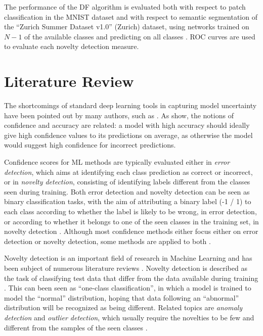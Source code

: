 \documentclass[10pt]{article}
\begin{document}
The performance of the \acrlong{DF} algorithm is evaluated both with respect to patch classification in the \gls{MNIST} dataset and with respect to semantic segmentation of the ``Zurich Summer Dataset v1.0'' (Zurich) dataset, using networks trained on $N-1$ of the available classes and predicting on all classes \cite{mnist, Volpi2015SemanticSO}. \acrfull{ROC} curves are used to evaluate each novelty detection measure.

\section{Literature Review}
\label{sec:lit}
The shortcomings of standard deep learning tools in capturing model uncertainty have been pointed out by many authors, such as \textcite{ghahramani, NguyenYC14, mandelbaum17}. As \textcite{subramanya} show, the notions of confidence and accuracy are related: a model with high accuracy should ideally give high confidence values to its predictions on average, as otherwise the model would suggest high confidence for incorrect predictions.

Confidence scores for \gls{ML} methods are typically evaluated either in \textit{error detection}, which aims at identifying each class prediction as correct or incorrect, or in \textit{novelty detection}, consisting of identifying labels different from the classes seen during training. Both error detection and novelty detection can be seen as binary classification tasks, with the aim of attributing a binary label (-1 / 1) to each class according to whether the label is likely to be wrong, in error detection, or according to whether it belongs to one of the seen classes in the training set, in novelty detection \cite{Bahat_2018, mandelbaum17}. Although most confidence methods either focus either on error detection or novelty detection, some methods are applied to both \cite{Sun2018KSconfA, Bahat_2018, mandelbaum17}.

Novelty detection is an important field of research in Machine Learning and has been subject of numerous literature reviews \cite{Bishop1994NoveltyDA, Markou2003NoveltyDApt1,Markou2003NoveltyDApt2,Pimentel2014ARO, deMorsier2014thesis}. Novelty detection is described as the task of classifying test data that differ from the data available during training \cite{Pimentel2014ARO}. This can been seen as ``one-class classification'', in which a model is trained to model the ``normal'' distribution, hoping that data following an ``abnormal'' distribution will be recognized as being different. Related topics are  \textit{anomaly detection} and \textit{outlier detection}, which usually require the novelties to be few and different from the samples of the seen classes \cite{deMorsier2014thesis, Pimentel2014ARO}.
\end{document}

